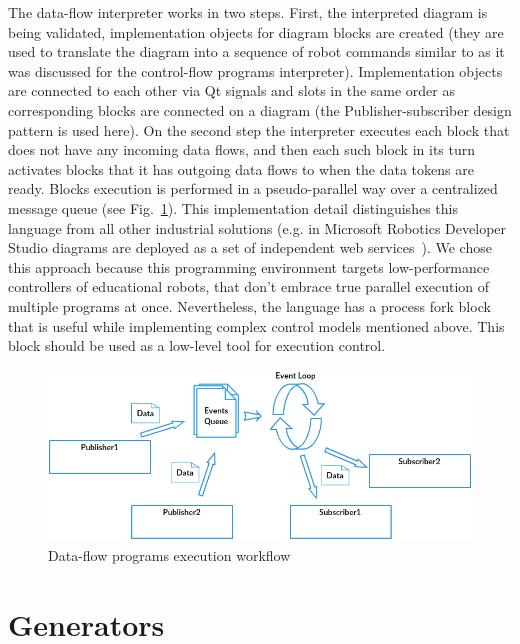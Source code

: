 \documentclass[conference]{IEEEtran}
\begin{document}
The data-flow interpreter works in two steps. First, the interpreted diagram is being validated, implementation objects for diagram blocks are created (they are used to translate the diagram into a sequence of robot commands similar to as it was discussed for the control-flow programs interpreter). Implementation objects are connected to each other via Qt signals and slots in the same order as corresponding blocks are connected on a diagram (the Publisher-subscriber design pattern is used here). On the second step the interpreter executes each block that does not have any incoming data flows, and then each such block in its turn activates blocks that it has outgoing data flows to when the data tokens are ready. Blocks execution is performed in a pseudo-parallel way over a centralized message queue (see Fig.~\ref{image:dsPseudoparallelism}). This implementation detail distinguishes this language from all other industrial solutions (e.g. in Microsoft Robotics Developer Studio diagrams are deployed as a set of independent web services~\cite{jackson2007microsoft}). We chose this approach because this programming environment targets low-performance controllers of educational robots, that don't embrace true parallel execution of multiple programs at once. Nevertheless, the language has a process fork block that is useful while implementing complex control models mentioned above. This block should be used as a low-level tool for execution control.

\begin{figure}[ht]
    \centering
    \includegraphics[width=\columnwidth]{DF_Interpretation_Process.png}
    \caption{Data-flow programs execution workflow}
    \label{image:dsPseudoparallelism}
\end{figure}

\section{Generators}
\label{chapter:generators}
\end{document}
